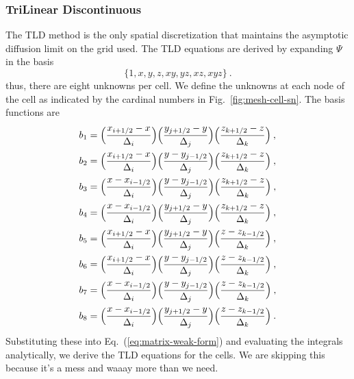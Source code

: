 \documentclass[12pt]{article}
\newcommand{\Di}{\ensuremath{\Delta_i}}
\newcommand{\Dj}{\ensuremath{\Delta_j}}
\newcommand{\Dk}{\ensuremath{\Delta_k}}
\begin{document}
\subsubsection*{TriLinear Discontinuous}
The TLD method is the only spatial discretization that maintains the
asymptotic diffusion limit on the grid used.  The
TLD equations are derived by expanding $\Psi$ in the basis
\begin{equation*}
  \{1,x,y,z,xy,yz,xz,xyz\}\:.
\end{equation*}
thus, there are eight unknowns per cell.  We define the unknowns at each node
of the cell as indicated by the cardinal numbers in Fig.~\ref{fig:mesh-cell-sn}.
The basis functions are
\begin{equation}
  \begin{aligned}
    b_1 &= \Bigl(\frac{x_{i+1/2}-x}{\Di}\Bigr)
    \Bigl(\frac{y_{j+1/2}-y}{\Dj}\Bigr) \Bigl(\frac{z_{k+1/2}-z}{\Dk}\Bigr)\:,\\
    b_2 &= \Bigl(\frac{x_{i+1/2}-x}{\Di}\Bigr)
    \Bigl(\frac{y-y_{j-1/2}}{\Dj}\Bigr) \Bigl(\frac{z_{k+1/2}-z}{\Dk}\Bigr)\:,\\
    b_3 &= \Bigl(\frac{x-x_{i-1/2}}{\Di}\Bigr)
    \Bigl(\frac{y-y_{j-1/2}}{\Dj}\Bigr) \Bigl(\frac{z_{k+1/2}-z}{\Dk}\Bigr)\:,\\
    b_4 &= \Bigl(\frac{x-x_{i-1/2}}{\Di}\Bigr)
    \Bigl(\frac{y_{j+1/2}-y}{\Dj}\Bigr) \Bigl(\frac{z_{k+1/2}-z}{\Dk}\Bigr)\:,\\
    b_5 &= \Bigl(\frac{x_{i+1/2}-x}{\Di}\Bigr)
    \Bigl(\frac{y_{j+1/2}-y}{\Dj}\Bigr) \Bigl(\frac{z-z_{k-1/2}}{\Dk}\Bigr)\:,\\
    b_6 &= \Bigl(\frac{x_{i+1/2}-x}{\Di}\Bigr)
    \Bigl(\frac{y-y_{j-1/2}}{\Dj}\Bigr) \Bigl(\frac{z-z_{k-1/2}}{\Dk}\Bigr)\:,\\
    b_7 &= \Bigl(\frac{x-x_{i-1/2}}{\Di}\Bigr)
    \Bigl(\frac{y-y_{j-1/2}}{\Dj}\Bigr) \Bigl(\frac{z-z_{k-1/2}}{\Dk}\Bigr)\:,\\
    b_8 &= \Bigl(\frac{x-x_{i-1/2}}{\Di}\Bigr)
    \Bigl(\frac{y_{j+1/2}-y}{\Dj}\Bigr) \Bigl(\frac{z-z_{k-1/2}}{\Dk}\Bigr)\:.
  \end{aligned}
  \label{eq:tld_basis}
\end{equation}
Substituting these into Eq.~(\ref{eq:matrix-weak-form}) and evaluating the
integrals analytically, we derive the TLD equations for the cells. We are skipping this because it's a mess and waaay more than we need. 


\end{document}
